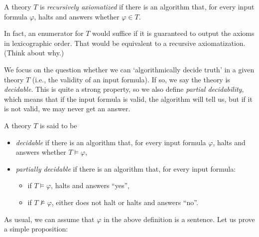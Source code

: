\begin{definition}
    A theory $T$ is \emph{recursively axiomatized} if there is an algorithm that, for every input formula $\varphi$, halts and answers whether $\varphi \in T$.
\end{definition}

\begin{remark}
    In fact, an enumerator for $T$ would suffice if it is guaranteed to output the axioms in lexicographic order. That would be equivalent to a recursive axiomatization. (Think about why.)
\end{remark}

We focus on the question whether we can `algorithmically decide truth' in a given theory $T$ (i.e., the validity of an input formula). If so, we say the theory is \emph{decidable}. This is quite a strong property, so we also define \emph{partial decidability}, which means that if the input formula is valid, the algorithm will tell us, but if it is not valid, we may never get an answer.

\begin{definition}[Decidability]
A theory $T$ is said to be
\begin{itemize}
    \item \emph{decidable} if there is an algorithm that, for every input formula $\varphi$, halts and answers whether $T \models \varphi$,
    \item \emph{partially decidable} if there is an algorithm that, for every input formula:
    \begin{itemize}
        \item if $T \models \varphi$, halts and answers ``yes'',
        \item if $T \not\models \varphi$, either does not halt or halts and answers ``no''.
    \end{itemize}
\end{itemize}
\end{definition}
As usual, we can assume that $\varphi$ in the above definition is a sentence. Let us prove a simple proposition:


